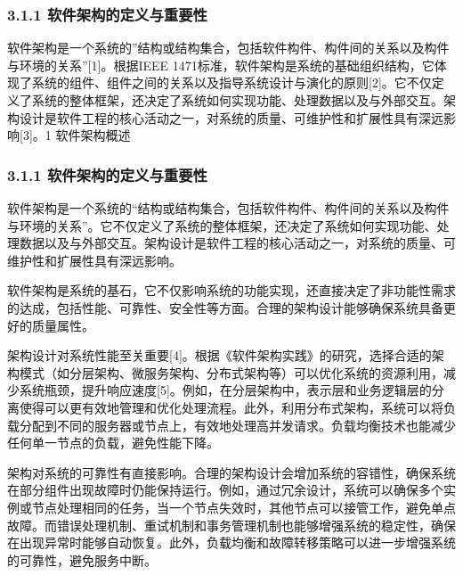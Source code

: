 \hypertarget{ux8f6fux4ef6ux67b6ux6784ux7684ux5b9aux4e49ux4e0eux91cdux8981ux6027}{%
\subsubsection{3.1.1 软件架构的定义与重要性}\label{ux8f6fux4ef6ux67b6ux6784ux7684ux5b9aux4e49ux4e0eux91cdux8981ux6027}}

软件架构是一个系统的''结构或结构集合，包括软件构件、构件间的关系以及构件与环境的关系''{[}1{]}。根据IEEE 1471标准，软件架构是系统的基础组织结构，它体现了系统的组件、组件之间的关系以及指导系统设计与演化的原则{[}2{]}。它不仅定义了系统的整体框架，还决定了系统如何实现功能、处理数据以及与外部交互。架构设计是软件工程的核心活动之一，对系统的质量、可维护性和扩展性具有深远影响{[}3{]}。1 软件架构概述

\hypertarget{ux8f6fux4ef6ux67b6ux6784ux7684ux5b9aux4e49ux4e0eux91cdux8981ux6027-1}{%
\subsubsection{3.1.1 软件架构的定义与重要性}\label{ux8f6fux4ef6ux67b6ux6784ux7684ux5b9aux4e49ux4e0eux91cdux8981ux6027-1}}

软件架构是一个系统的``结构或结构集合，包括软件构件、构件间的关系以及构件与环境的关系''。它不仅定义了系统的整体框架，还决定了系统如何实现功能、处理数据以及与外部交互。架构设计是软件工程的核心活动之一，对系统的质量、可维护性和扩展性具有深远影响。


软件架构是系统的基石，它不仅影响系统的功能实现，还直接决定了非功能性需求的达成，包括性能、可靠性、安全性等方面。合理的架构设计能够确保系统具备更好的质量属性。

架构设计对系统性能至关重要{[}4{]}。根据《软件架构实践》的研究，选择合适的架构模式（如分层架构、微服务架构、分布式架构等）可以优化系统的资源利用，减少系统瓶颈，提升响应速度{[}5{]}。例如，在分层架构中，表示层和业务逻辑层的分离使得可以更有效地管理和优化处理流程。此外，利用分布式架构，系统可以将负载分配到不同的服务器或节点上，有效地处理高并发请求。负载均衡技术也能减少任何单一节点的负载，避免性能下降。

架构对系统的可靠性有直接影响。合理的架构设计会增加系统的容错性，确保系统在部分组件出现故障时仍能保持运行。例如，通过冗余设计，系统可以确保多个实例或节点处理相同的任务，当一个节点失效时，其他节点可以接管工作，避免单点故障。而错误处理机制、重试机制和事务管理机制也能够增强系统的稳定性，确保在出现异常时能够自动恢复。此外，负载均衡和故障转移策略可以进一步增强系统的可靠性，避免服务中断。


